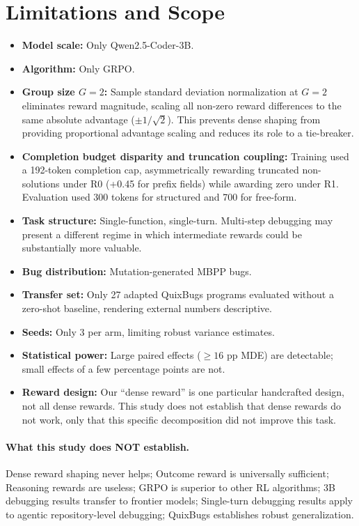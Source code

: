 \documentclass{article}
\begin{document}
\section{Limitations and Scope}
\begin{itemize}
\item \textbf{Model scale:} Only Qwen2.5-Coder-3B.
\item \textbf{Algorithm:} Only GRPO.
\item \textbf{Group size $G=2$:} Sample standard deviation normalization at $G=2$ eliminates reward magnitude, scaling all non-zero reward differences to the same absolute advantage ($\pm 1/\sqrt{2}$). This prevents dense shaping from providing proportional advantage scaling and reduces its role to a tie-breaker.
\item \textbf{Completion budget disparity and truncation coupling:} Training used a 192-token completion cap, asymmetrically rewarding truncated non-solutions under R0 (+0.45 for prefix fields) while awarding zero under R1. Evaluation used 300 tokens for structured and 700 for free-form.
\item \textbf{Task structure:} Single-function, single-turn. Multi-step debugging may present a different regime in which intermediate rewards could be substantially more valuable.
\item \textbf{Bug distribution:} Mutation-generated MBPP bugs.
\item \textbf{Transfer set:} Only 27 adapted QuixBugs programs evaluated without a zero-shot baseline, rendering external numbers descriptive.
\item \textbf{Seeds:} Only 3 per arm, limiting robust variance estimates.
\item \textbf{Statistical power:} Large paired effects ($\ge 16$ pp MDE) are detectable; small effects of a few percentage points are not.
\item \textbf{Reward design:} Our ``dense reward'' is one particular handcrafted design, not all dense rewards. This study does not establish that dense rewards do not work, only that this specific decomposition did not improve this task.
\end{itemize}

\paragraph{What this study does NOT establish.}
Dense reward shaping never helps; Outcome reward is universally sufficient; Reasoning rewards are useless; GRPO is superior to other RL algorithms; 3B debugging results transfer to frontier models; Single-turn debugging results apply to agentic repository-level debugging; QuixBugs establishes robust generalization.
\end{document}
